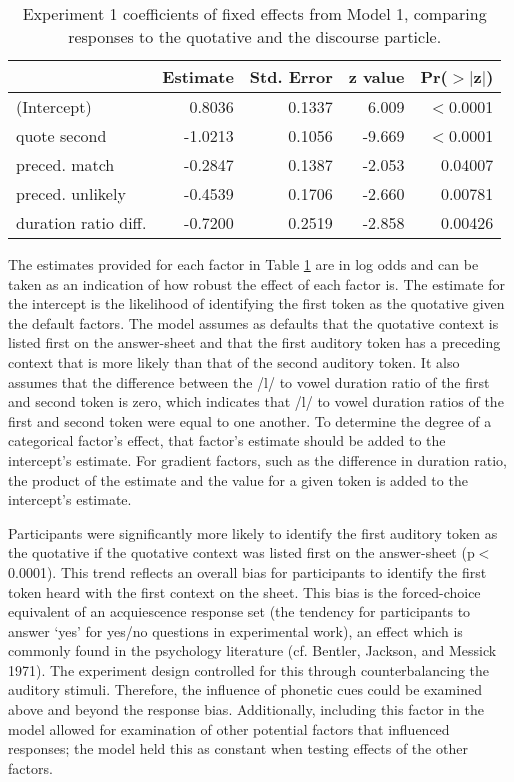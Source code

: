  
\begin{table}[ht]
\begin{center}
\begin{tabular}{lrrrr}
  \hline
 & Estimate & Std. Error & z value& Pr($>$$|$z$|$) \\
  \hline
(Intercept) & 0.8036   &  0.1337 &  6.009 & $<$0.0001\\
  quote second & -1.0213  &   0.1056 & -9.669  & $<$0.0001 \\
  preced. match & -0.2847  &   0.1387  & -2.053 & 0.04007 \\
  preced. unlikely & -0.4539  &   0.1706 & -2.660 & 0.00781 \\
  duration ratio diff. & -0.7200  &   0.2519  & -2.858 & 0.00426 \\
   \hline
\end{tabular}
\caption{Experiment 1 coefficients of fixed effects from Model 1, comparing responses to the quotative and the discourse particle.}
\label{qdcoeff1}
\end{center}
\end{table}	



The estimates provided for each factor in Table \ref{qdcoeff1} are in log odds and can be taken as an indication of how robust the effect of each factor is.  The estimate for the intercept is the likelihood of identifying the first token as the quotative given the default factors.  The model assumes as defaults that the quotative context is listed first on the answer-sheet and that the first auditory token has a preceding context that is more likely than that of the second auditory token.  It also assumes that the difference between the /l/ to vowel duration ratio of the first and second token is zero, which indicates that /l/ to vowel duration ratios of the first and second token were equal to one another.  To determine the degree of a categorical factor's effect, that factor's estimate should be added to the intercept's estimate.  For gradient factors, such as the difference in duration ratio, the product of the estimate and the value for a given token is added to the intercept's estimate.

Participants were significantly more likely to identify the first auditory token as the quotative if the quotative context was listed first on the answer-sheet (p$<$0.0001).  This trend reflects an overall bias for participants to identify the first token heard with the first context on the sheet.  This bias is the forced-choice equivalent of an acquiescence response set (the tendency for participants to answer `yes' for yes/no questions in experimental work), an effect which is commonly found in the psychology literature (cf. Bentler, Jackson, and Messick 1971).  The experiment design controlled for this through counterbalancing the auditory stimuli.  Therefore, the influence of phonetic cues could be examined above and beyond the response  bias.  Additionally, including this factor in the model allowed for examination of other potential factors that influenced responses; the model held this as constant when testing effects of the other factors.  
\nocite{bentleretal1971}


